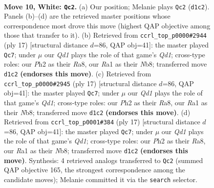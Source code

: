 \documentclass[11pt]{article}
\begin{document}
\clearpage

\begin{figure}[p]\centering
\begin{subfigure}{0.46\textwidth}\centering
\resizebox{\linewidth}{!}{%
\newchessgame
\chessboard[
  setfen={r1bqk3/pp1n1ppr/2n1p3/3pP3/1b1P4/5P2/PP1N2PP/R1BQK1NR w KQq - 1 10},
  showmover=false,
  pgfstyle=straightmove, color=movearrow, markmove={d1-c2}
]}
\caption{}
\end{subfigure}\hfill
\begin{subfigure}{0.46\textwidth}\centering
\resizebox{\linewidth}{!}{%
\newchessgame
\chessboard[
  setfen={rnbqkb1r/5ppp/p3pn2/1p2P1B1/3N4/2N5/PPP3PP/R2QKB1R b KQkq - 0 9},
  showmover=false,
  pgfstyle=straightmove, color=movearrow, markmove={d8-c7}
]}
\caption{}
\end{subfigure}
\\[4pt]
\begin{subfigure}{0.46\textwidth}\centering
\resizebox{\linewidth}{!}{%
\newchessgame
\chessboard[
  setfen={rnbqkb1r/5ppp/p3pn2/1p2P1B1/3N4/2N5/PPP3PP/R2QKB1R b KQkq - 0 9},
  showmover=false,
  pgfstyle=straightmove, color=movearrow, markmove={d8-c7}
]}
\caption{}
\end{subfigure}\hfill
\begin{subfigure}{0.46\textwidth}\centering
\resizebox{\linewidth}{!}{%
\newchessgame
\chessboard[
  setfen={rnbqkb1r/5ppp/p3pn2/1p2P1B1/3N4/2N5/PPP3PP/R2QKB1R b KQkq - 0 9},
  showmover=false,
  pgfstyle=straightmove, color=movearrow, markmove={d8-c7}
]}
\caption{}
\end{subfigure}
\caption{\textbf{Move 10, White: \texttt{Qc2}.} (a) Our position; Melanie plays \texttt{Qc2} (\texttt{d1c2}). Panels (b)--(d) are the retrieved master positions whose correspondence most drove this move (highest QAP objective among those that transfer to it). (b) Retrieved from \texttt{ccrl\_top\_p0000\#2944} (ply 17) [structural distance $d$=86, QAP obj=41]: the master played \texttt{Qc7}; under $\mu$ our \emph{Qd1} plays the role of that game's \emph{Qd1}; cross-type roles: our \emph{P}h2 as their \emph{R}a8, our \emph{R}a1 as their \emph{N}b8; transferred move \texttt{d1c2} \textbf{(endorses this move)}. (c) Retrieved from \texttt{ccrl\_top\_p0000\#2945} (ply 17) [structural distance $d$=86, QAP obj=41]: the master played \texttt{Qc7}; under $\mu$ our \emph{Qd1} plays the role of that game's \emph{Qd1}; cross-type roles: our \emph{P}h2 as their \emph{R}a8, our \emph{R}a1 as their \emph{N}b8; transferred move \texttt{d1c2} \textbf{(endorses this move)}. (d) Retrieved from \texttt{ccrl\_top\_p0001\#384} (ply 17) [structural distance $d$=86, QAP obj=41]: the master played \texttt{Qc7}; under $\mu$ our \emph{Qd1} plays the role of that game's \emph{Qd1}; cross-type roles: our \emph{P}h2 as their \emph{R}a8, our \emph{R}a1 as their \emph{N}b8; transferred move \texttt{d1c2} \textbf{(endorses this move)}. Synthesis: 4 retrieved analogs transferred to \texttt{Qc2} (summed QAP objective 165, the strongest correspondence among the candidate moves); Melanie committed it via the \texttt{search} selector.}
\label{fig:thought-m18}
\end{figure}
\end{document}
